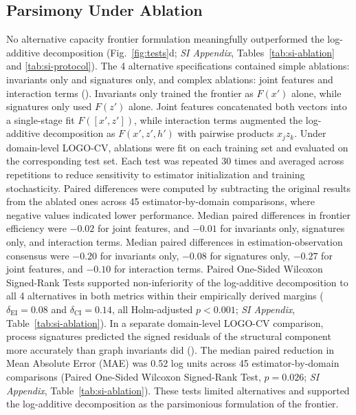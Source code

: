 \documentclass{article}
\begin{document}
\subsection*{Parsimony Under Ablation}
\label{sub-sec:ablate}
No alternative capacity frontier formulation meaningfully outperformed the log-additive decomposition (Fig.~\ref{fig:tests}d; \textit{SI Appendix}, Tables~\ref{tab:si-ablation} and \ref{tab:si-protocol}). The 4 alternative specifications contained simple ablations: invariants only and signatures only, and complex ablations: joint features and interaction terms (). Invariants only trained the frontier as $F(x')$ alone, while signatures only used $F(z')$ alone. Joint features concatenated both vectors into a single-stage fit $F([x', z'])$, while interaction terms augmented the log-additive decomposition as $F(x', z', h')$ with pairwise products $x_j z_k$. Under domain-level LOGO-CV, ablations were fit on each training set and evaluated on the corresponding test set. Each test was repeated 30 times and averaged across repetitions to reduce sensitivity to estimator initialization and training stochasticity. Paired differences were computed by subtracting the original results from the ablated ones across 45 estimator-by-domain comparisons, where negative values indicated lower performance. Median paired differences in frontier efficiency were $-0.02$ for joint features, and $-0.01$ for invariants only, signatures only, and interaction terms. Median paired differences in estimation-observation consensus were $-0.20$ for invariants only, $-0.08$ for signatures only, $-0.27$ for joint features, and $-0.10$ for interaction terms. Paired One-Sided Wilcoxon Signed-Rank Tests supported non-inferiority of the log-additive decomposition to all 4 alternatives in both metrics within their empirically derived margins ($\delta_{\mathrm{EI}} = 0.08$ and $\delta_{\mathrm{CI}} = 0.14$, all Holm-adjusted $p < 0.001$; \textit{SI Appendix}, Table~\ref{tab:si-ablation}). In a separate domain-level LOGO-CV comparison, process signatures predicted the signed residuals of the structural component more accurately than graph invariants did (). The median paired reduction in Mean Absolute Error (MAE) was 0.52 log units across 45 estimator-by-domain comparisons (Paired One-Sided Wilcoxon Signed-Rank Test, $p = 0.026$; \textit{SI Appendix}, Table~\ref{tab:si-ablation}). These tests limited alternatives and supported the log-additive decomposition as the parsimonious formulation of the frontier.
\end{document}
